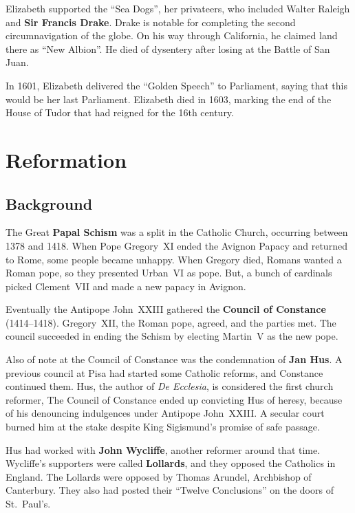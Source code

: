 Elizabeth supported the ``Sea Dogs'', her privateers,
who included Walter Raleigh and \textbf{Sir Francis Drake}.
Drake is notable for completing the second circumnavigation of the globe.
On his way through California, he claimed land there as ``New Albion''.
He died of dysentery after losing at the Battle of San Juan.

In 1601, Elizabeth delivered the ``Golden Speech'' to Parliament,
saying that this would be her last Parliament.
Elizabeth died in 1603, marking the end of the House of Tudor that had reigned for the 16th century.

\section{Reformation}

\subsection*{Background}

The Great \textbf{Papal Schism} was a split in the Catholic Church, occurring between 1378 and 1418.
When Pope Gregory~XI ended the Avignon Papacy and returned to Rome, some people became unhappy.
When Gregory died, Romans wanted a Roman pope, so they presented Urban~VI as pope.
But, a bunch of cardinals picked Clement~VII and made a new papacy in Avignon.

Eventually the Antipope John~XXIII gathered the \textbf{Council of Constance} (1414--1418).
Gregory~XII, the Roman pope, agreed, and the parties met.
The council succeeded in ending the Schism by electing Martin~V as the new pope.

Also of note at the Council of Constance was the condemnation of \textbf{Jan Hus}.
A previous council at Pisa had started some Catholic reforms, and Constance continued them.
Hus, the author of \textit{De Ecclesia}, is considered the first church reformer,
The Council of Constance ended up convicting Hus of heresy,
because of his denouncing indulgences under Antipope John~XXIII\@.
A secular court burned him at the stake despite King Sigismund's promise of safe passage.

Hus had worked with \textbf{John Wycliffe}, another reformer around that time.
Wycliffe's supporters were called \textbf{Lollards}, and they opposed the Catholics in England.
The Lollards were opposed by Thomas Arundel, Archbishop of Canterbury.
They also had posted their ``Twelve Conclusions'' on the doors of St.\ Paul's.

